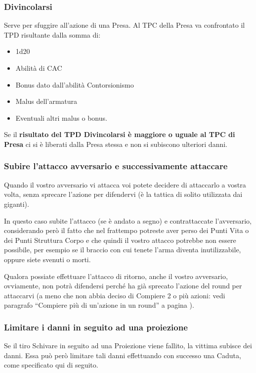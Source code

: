 \iffullversion
\subsubsection{Divincolarsi} 

Serve per sfuggire all'azione di una Presa. Al TPC della Presa va
confrontato il TPD risultante dalla somma di: 

\begin{itemize}
\itemsep -6pt
\item 1d20 
\item Abilit\`a di CAC
\item Bonus dato dall'abilit\`a Contorsionismo
\item Malus dell'armatura
\item Eventuali altri malus o bonus.
\end{itemize}

Se il \textbf{risultato del TPD Divincolarsi \`e maggiore o uguale al
  TPC di Presa} ci si \`e liberati dalla Presa stessa e non si
subiscono ulteriori danni.  \fi

{\raggedright \subsubsection{Subire l'attacco avversario e successivamente attaccare}}

Quando il vostro avversario vi attacca voi potete decidere di
attaccarlo a vostra volta, senza sprecare l'azione per difendervi
(\`e la tattica di solito utilizzata dai giganti).

In questo caso subite l'attacco (se \`e andato a segno) e
contrattaccate l'avversario, considerando per\`o il fatto che nel
frattempo potreste aver perso dei Punti Vita o dei Punti Struttura
Corpo e che quindi il vostro attacco potrebbe non essere possibile,
per esempio se il braccio con cui tenete l'arma diventa
inutilizzabile, oppure siete svenuti o morti.

Qualora possiate effettuare l'attacco di ritorno, anche il vostro
avversario, ovviamente, non potr\`a difendersi perch\'e ha gi\`a
sprecato l'azione del round per attaccarvi
\iffullversion
 (a meno che non abbia
deciso di Compiere 2 o pi\`u azioni: vedi paragrafo ``Compiere
pi\`u di un'azione in un round'' a pagina \pageref{azionemultipla}).


\subsubsection{Limitare i danni in seguito ad una proiezione}
\label{limitaredanni}
Se il tiro Schivare in seguito ad una Proiezione viene fallito, la
vittima subisce dei danni. Essa pu\`o per\`o limitare tali danni
effettuando con successo una Caduta, come specificato qui di seguito.

